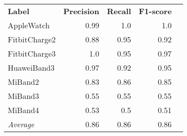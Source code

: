 \begin{tabular}{lrrrr}
    \textbf{Label} & \textbf{Precision} & \textbf{Recall} & \textbf{F1-score} \\
    AppleWatch & 0.99 & 1.0 & 1.0 \\
    FitbitCharge2 & 0.88 & 0.95 & 0.92 \\
    FitbitCharge3 & 1.0 & 0.95 & 0.97 \\
    HuaweiBand3 & 0.97 & 0.92 & 0.95 \\
    MiBand2 & 0.83 & 0.86 & 0.85 \\
    MiBand3 & 0.55 & 0.55 & 0.55 \\
    MiBand4 & 0.53 & 0.5 & 0.51 \\
    \emph{Average} & 0.86 & 0.86 & 0.86 \\
\end{tabular}